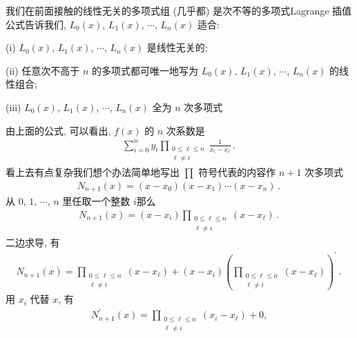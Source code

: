 \begin{remark}
    我们在前面接触的线性无关的多项式组 (几乎都) 是次不等的多项式\period Lagrange 插值公式告诉我们, $L_0 (x)$, $L_1 (x)$, $\cdots$, $L_n (x)$ 适合:

    (i) $L_0 (x)$, $L_1 (x)$, $\cdots$, $L_n (x)$ 是线性无关的;

    (ii) 任意次不高于 $n$ 的多项式都可唯一地写为 $L_0 (x)$, $L_1 (x)$, $\cdots$, $L_n (x)$ 的线性组合;

    (iii) $L_0 (x)$, $L_1 (x)$, $\cdots$, $L_n (x)$ 全为 $n$ 次多项式\period
\end{remark}

\begin{remark}
    由上面的公式, 可以看出, $f(x)$ 的 $n$ 次系数是
    \begin{align*}
        \sum_{i = 0}^{n} y_i \prod_{\begin{smallmatrix}0 \leq \ell \leq n \\\ell \neq i\end{smallmatrix}} \frac{1}{x_i - x_\ell} \period
    \end{align*}
    看上去有点复杂\period 我们想个办法简单地写出 $\prod$ 符号代表的内容\period 作 $n+1$ 次多项式
    \begin{align*}
        N_{n+1} (x) = (x - x_0) (x - x_1) \cdots (x - x_n) \period
    \end{align*}
    从 $0$, $1$, $\cdots$, $n$ 里任取一个整数 $i$\period 那么
    \begin{align*}
        N_{n+1} (x) = (x - x_i) \prod_{\begin{smallmatrix}0 \leq \ell \leq n \\\ell \neq i\end{smallmatrix}} (x - x_\ell) \period
    \end{align*}
    二边求导, 有
    \begin{align*}
        N_{n+1} (x) = \prod_{\begin{smallmatrix}0 \leq \ell \leq n \\\ell \neq i\end{smallmatrix}} (x - x_\ell) + (x - x_i) \left( \prod_{\begin{smallmatrix}0 \leq \ell \leq n \\\ell \neq i\end{smallmatrix}} (x - x_\ell) \right)^{\prime} \period
    \end{align*}
    用 $x_i$ 代替 $x$, 有
    \begin{align*}
        N_{n+1}^{\prime} (x) = \prod_{\begin{smallmatrix}0 \leq \ell \leq n \\\ell \neq i\end{smallmatrix}} (x_i - x_\ell) + 0,

\end{align*}
\end{remark}
